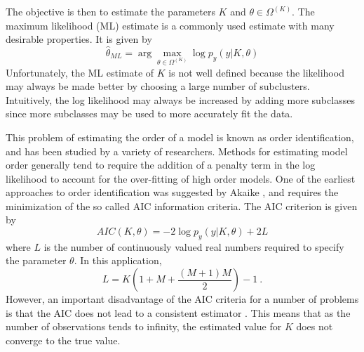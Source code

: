 \documentclass[12pt]{article}
\begin{document}
The objective is then to estimate the parameters
$K$ and $\theta \in \Omega^{(K)}$.
The maximum likelihood (ML) estimate is a commonly
used estimate with many desirable properties.
It is given by
$$
\hat{\theta}_{ML} = \arg \max_{\theta\in \Omega^{(K)}} \log p_y( y |K,\theta )
$$
Unfortunately, the ML estimate of $K$ is not well defined
because the likelihood may always be made better by choosing
a large number of subclusters.
Intuitively, the log likelihood may always be increased
by adding more subclasses since more subclasses may be
used to more accurately fit the data.

This problem of estimating the order of a model 
is known as order identification, and has been
studied by a variety of researchers.
Methods for estimating model order generally tend to require the addition
of a penalty term in the log likelihood to account
for the over-fitting of high order models.
One of the earliest approaches to order identification
was suggested by Akaike \cite{AK74},
and requires the minimization of the so called AIC
information criteria.
The AIC criterion is given by
$$
AIC(K,\theta) = -2\log p_y( y |K,\theta ) +2 L
$$
where $L$ is the number of continuously
valued real numbers required to specify the parameter $\theta$.
In this application,
$$
L =  K\left(1 + M + \frac{(M+1)M}{2}\right) - 1 \ .
$$
However, an important disadvantage of the AIC criteria
for a number of problems is that the AIC does not
lead to a consistent estimator \cite{Ka80}.
This means that as the number of observations tends to infinity,
the estimated value for $K$ does not converge to the true
value. 
\end{document}
